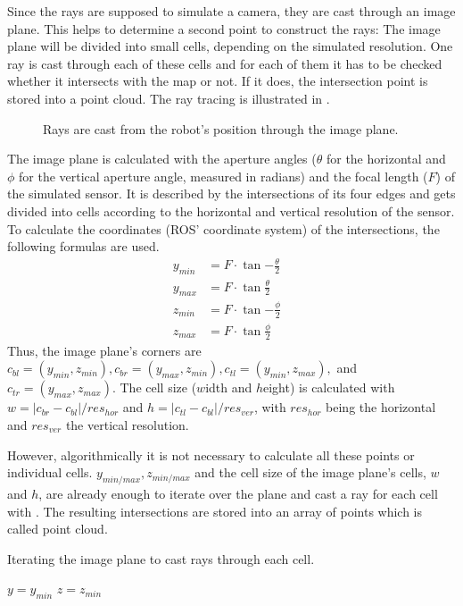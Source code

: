 \documentclass[Thesis.tex]{subfiles}
\begin{document}
Since the rays are supposed to simulate a camera, they are cast through an image plane. This helps to determine a second point to construct the rays: The image plane will be divided into small cells, depending on the simulated resolution. One ray is cast through each of these cells and for each of them it has to be checked whether it intersects with the map or not. If it does, the intersection point is stored into a point cloud. The ray tracing is illustrated in .
%
\begin{figure}[!htp]
  \caption{Rays are cast from the robot's position through the image plane.}
  \label{fig:raytrace_scheme}
\end{figure}
%
The image plane is calculated with the aperture angles ($\theta$ for the horizontal and $\phi$ for the vertical aperture angle, measured in radians) and the focal length ($F$) of the simulated sensor. It is described by the intersections of its four edges and gets divided into cells according to the horizontal and vertical resolution of the sensor. To calculate the coordinates (\gls{ROS}' coordinate system) of the intersections, the following formulas are used.
%
\begin{align}
y_{min} &= F \cdot \tan{-\frac{\theta}{2}} &\label{form:image_plane} \\
y_{max} &= F \cdot \tan{ \frac{\theta}{2}} &\\
z_{min} &= F \cdot \tan{-\frac{\phi}{2}} &\\
z_{max} &= F \cdot \tan{ \frac{\phi}{2}} &
\end{align}
%
Thus, the image plane's corners are $c_{bl}=(y_{min}, z_{min}), c_{br}=(y_{max}, z_{min}), c_{tl}=(y_{min}, z_{max}),$ and $c_{tr}=(y_{max}, z_{max})$. The cell size ($w$idth and $h$eight) is calculated with $w=|c_{br}-c_{bl}|/res_{hor}$ and $h=|c_{tl}-c_{bl}|/res_{ver}$, with $res_{hor}$ being the horizontal and $res_{ver}$ the vertical resolution.

However, algorithmically it is not necessary to calculate all these points or individual cells. $y_{min/max}, z_{min/max}$ and the cell size of the image plane's cells, $w$ and $h$, are already enough to iterate over the plane and cast a ray for each cell with . The resulting intersections are stored into an array of points which is called point cloud.
%
\begin{algorithm}[!htp]
\caption{Iterating the image plane to cast rays through each cell.}
\label{alg:iterate_imageplane}
$y = y_{min}$\;
$z = z_{min}$\;
\end{algorithm}
\end{document}

